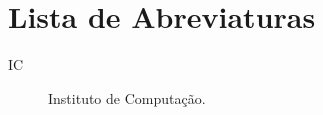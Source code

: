 \chapter*{Lista de Abreviaturas}

\begin{description}
  \item[IC] \quad Instituto de Computação.
\end{description}